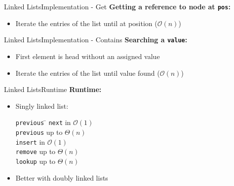 
\begin{frame}[fragile]{Linked Lists}{Implementation - Get}
  \textbf{Getting a reference to node at \texttt{pos}:}
  \begin{itemize}
    \item
      Iterate the entries of the list until at position ($\mathcal{O}(n)$)
      
  \end{itemize}
\end{frame}


\begin{frame}[fragile]{Linked Lists}{Implementation - Contains}
  \textbf{Searching a \texttt{value}:}
  \begin{itemize}
    \item
      First element is head without an assigned value
    \item
      Iterate the entries of the list until value found ($\mathcal{O}(n)$)
      
  \end{itemize}
\end{frame}


\begin{frame}{Linked Lists}{Runtime}
  \textbf{Runtime:}
  \begin{itemize}
    \item
      Singly linked list:
      \begin{tabbing}
        {\color{Mittel-Blau}\texttt{previous}} \=\kill
        {\color{Mittel-Blau}\texttt{next}} \>
        in $\mathcal{O}(1)$\\
        {\color{Mittel-Blau}\texttt{previous}} \>
        up to $\Theta(n)$\\
        {\color{Mittel-Blau}\texttt{insert}} \>
        in $\mathcal{O}(1)$\\
        {\color{Mittel-Blau}\texttt{remove}} \>
        up to $\Theta(n)$\\
        {\color{Mittel-Blau}\texttt{lookup}} \>
        up to $\Theta(n)$
      \end{tabbing}
    \item
      Better with {\color{Mittel-Blau}doubly linked lists}
  \end{itemize}
\end{frame}

